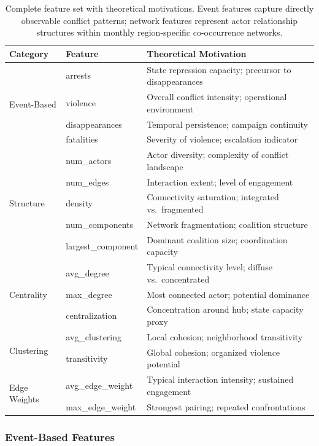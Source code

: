 \documentclass[pdflatex,sn-mathphys-num]{sn-jnl}%
\theoremstyle{thmstyleone}%
\theoremstyle{thmstyletwo}%
\theoremstyle{thmstylethree}%
\begin{document}
\begin{table}[t]
\centering
\caption{Complete feature set with theoretical motivations. Event features capture directly observable conflict patterns; network features represent actor relationship structures within monthly region-specific co-occurrence networks.}
\label{tab:features}
\begin{tabular}{llp{7.5cm}}
\toprule
\textbf{Category} & \textbf{Feature} & \textbf{Theoretical Motivation} \\
\midrule
\multirow{4}{*}{Event-Based} 
& arrests & State repression capacity; precursor to disappearances \\
& violence & Overall conflict intensity; operational environment \\
& disappearances & Temporal persistence; campaign continuity \\
& fatalities & Severity of violence; escalation indicator \\
\midrule
\multirow{5}{*}{Structure} 
& num\_actors & Actor diversity; complexity of conflict landscape \\
& num\_edges & Interaction extent; level of engagement \\
& density & Connectivity saturation; integrated vs.\ fragmented \\
& num\_components & Network fragmentation; coalition structure \\
& largest\_component & Dominant coalition size; coordination capacity \\
\midrule
\multirow{3}{*}{Centrality} 
& avg\_degree & Typical connectivity level; diffuse vs.\ concentrated \\
& max\_degree & Most connected actor; potential dominance \\
& centralization & Concentration around hub; state capacity proxy \\
\midrule
\multirow{2}{*}{Clustering} 
& avg\_clustering & Local cohesion; neighborhood transitivity \\
& transitivity & Global cohesion; organized violence potential \\
\midrule
\multirow{2}{*}{Edge Weights} 
& avg\_edge\_weight & Typical interaction intensity; sustained engagement \\
& max\_edge\_weight & Strongest pairing; repeated confrontations \\
\bottomrule
\end{tabular}
\end{table}

\subsubsection{Event-Based Features}
\end{document}
